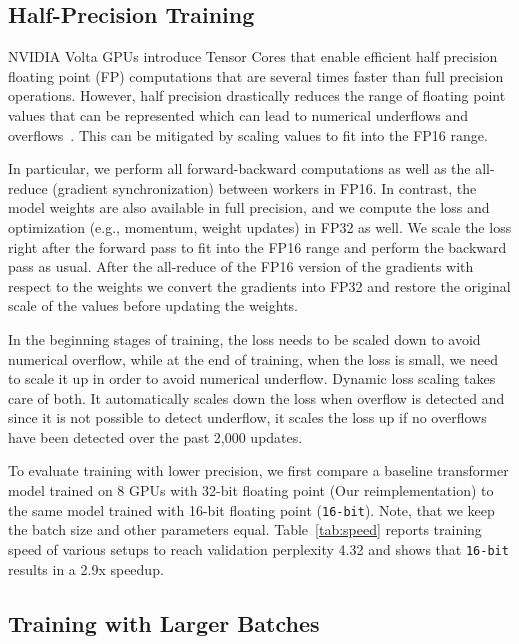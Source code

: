 \documentclass[11pt,a4paper]{article}
\begin{document}
\subsection{Half-Precision Training}\label{sec:exp_fp16}

NVIDIA Volta GPUs introduce Tensor Cores that enable efficient half precision floating point (FP) computations that are several times faster than full precision operations. 
However, half precision drastically reduces the range of floating point values that can be represented which can lead to numerical underflows and overflows~\citep{narang2018iclr}.
This can be mitigated by scaling values to fit into the FP16 range.

In particular, we perform all forward-backward computations as well as the all-reduce (gradient synchronization) between workers in FP16. 
In contrast, the model weights are also available in full precision, and we compute the loss and optimization (e.g., momentum, weight updates) in FP32 as well.
We scale the loss right after the forward pass to fit into the FP16 range and perform the backward pass as usual. 
After the all-reduce of the FP16 version of the gradients with respect to the weights we convert the gradients into FP32 and restore the original scale of the values before updating the weights.

In the beginning stages of training, the loss needs to be scaled down to avoid numerical overflow, while at the end of training, when the loss is small, we need to scale it up in order to avoid numerical underflow.
Dynamic loss scaling takes care of both. 
It automatically scales down the loss when overflow is detected and since it is not possible to detect underflow, it scales the loss up if no overflows have been detected over the past 2,000 updates.

To evaluate training with lower precision, we first compare a baseline transformer model trained on 8 GPUs with 32-bit floating point (Our reimplementation) to the same model trained with 16-bit floating point (\texttt{16-bit}). Note, that we keep the batch size and other parameters equal. 
Table~\ref{tab:speed} reports training speed of various setups to reach validation perplexity 4.32 and shows that \texttt{16-bit} results in a 2.9x speedup. 


\subsection{Training with Larger Batches}\label{sec:large_batches}
\end{document}

